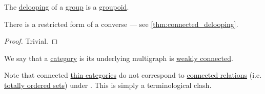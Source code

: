 \begin{proposition}\label{thm:delooping_of_group}
  The \hyperref[def:monoid_delooping]{delooping} of a \hyperref[def:group]{group} is a \hyperref[def:groupoid]{groupoid}.
\end{proposition}
\begin{comments}
  \item There is a restricted form of a converse --- see \cref{thm:connected_delooping}.
\end{comments}
\begin{proof}
  Trivial.
\end{proof}

\begin{definition}\label{def:connected_category}
  We say that a \hyperref[def:category]{category} is  its underlying multigraph is \hyperref[def:graph_connectedness/weak]{weakly connected}.
\end{definition}
\begin{comments}
  \item Note that connected \hyperref[def:thin_category]{thin categories} do not correspond to \hyperref[def:binary_relation/connected]{connected relations} (i.e. \hyperref[def:totally_ordered_set]{totally ordered sets}) under . This is simply a terminological clash.
\end{comments}

